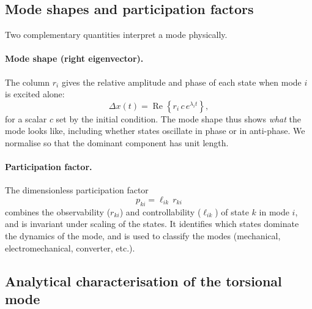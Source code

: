 \subsection{Mode shapes and participation factors}
\label{subsec:modeshape}

Two complementary quantities interpret a mode physically.

\paragraph{Mode shape (right eigenvector).}
The column $r_i$ gives the relative amplitude and phase of each state when
mode $i$ is excited alone:
\begin{equation}
  \Delta x(t) = \operatorname{Re}\!\left\{ r_i\, c\, e^{\lambda_i t} \right\},
  \label{eq:modeshape}
\end{equation}
for a scalar $c$ set by the initial condition. The mode shape thus shows
\emph{what} the mode looks like, including whether states oscillate in phase or
in anti-phase. We normalise so that the dominant component has unit length.

\paragraph{Participation factor.}
The dimensionless participation factor
\begin{equation}
  p_{ki} = \ell_{ik}\, r_{ki}
  \label{eq:pf}
\end{equation}
combines the observability ($r_{ki}$) and controllability ($\ell_{ik}$) of
state $k$ in mode $i$, and is invariant under scaling of the states. It
identifies which states dominate the dynamics of the mode, and is used to
classify the modes (mechanical, electromechanical, converter, etc.).

\subsection{Analytical characterisation of the torsional mode}
\label{subsec:torsion}

